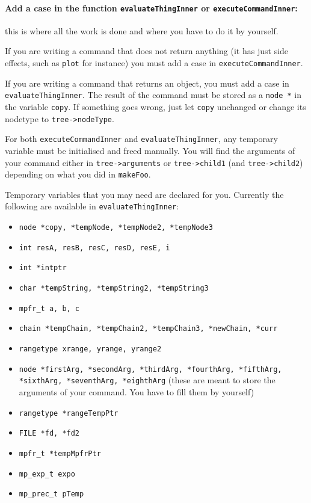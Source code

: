 \documentclass{article}
\newcommand{\commandMakeFunc}{\texttt{makeFoo}}
\begin{document}
\paragraph{Add a case in the function \texttt{evaluateThingInner} or \texttt{executeCommandInner}: } this is where all the work is done and where you have to do it by yourself.

If you are writing a command that does not return anything (it has just side effects, such as \texttt{plot} for instance) you must add a case in \texttt{executeCommandInner}.

If you are writing a command that returns an object, you must add a case in \texttt{evaluateThingInner}. The result of the command must be stored as a \texttt{node *} in the variable \texttt{copy}. If something goes wrong, just let \texttt{copy} unchanged or change its nodetype to \texttt{tree->nodeType}.

For both \texttt{executeCommandInner} and \texttt{evaluateThingInner}, any temporary variable must be initialised and freed manually. You will find the arguments of your command either in \texttt{tree->arguments} or \texttt{tree->child1} (and \texttt{tree->child2}) depending on what you did in \commandMakeFunc.

Temporary variables that you may need are declared for you. Currently the following are available in \texttt{evaluateThingInner}:
\begin{itemize}
\item \texttt{node *copy, *tempNode, *tempNode2, *tempNode3}
\item \texttt{int resA, resB, resC, resD, resE, i}
\item \texttt{int *intptr}
\item \texttt{char *tempString, *tempString2, *tempString3}
\item \texttt{mpfr\_t a, b, c}
\item \texttt{chain *tempChain, *tempChain2, *tempChain3, *newChain, *curr}
\item \texttt{rangetype xrange, yrange, yrange2}
\item \texttt{node *firstArg, *secondArg, *thirdArg, *fourthArg, *fifthArg, *sixthArg, *seventhArg, *eighthArg} (these are meant to store the arguments of your command. You have to fill them by yourself)
\item \texttt{rangetype *rangeTempPtr}
\item \texttt{FILE *fd, *fd2}
\item \texttt{mpfr\_t *tempMpfrPtr}
\item \texttt{mp\_exp\_t expo}
\item \texttt{mp\_prec\_t pTemp}
\end{itemize}
\end{document}
